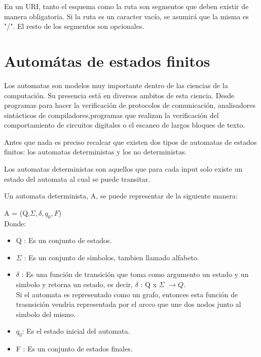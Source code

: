 \documentclass{article}
\begin{document}
En un URI, tanto el esquema como la ruta son segmentos que deben existir de manera obligatoria. Si la ruta es un caracter vac\'io, se asumir\'a que la misma es "/". El resto de los segmentos son opcionales.\\

\section{Autom\'atas de estados finitos}

Los automatas son modelos muy importante dentro de las ciencias de la computaci\'on. Su presencia est\'a  en diversos ambitos de esta ciencia. Desde programas para hacer la verificaci\'on de protocolos de comunicaci\'on, analisadores sint\'acticos de compiladores,programas que realizan la verificaci\'on del comportamiento de circuitos digitales o el escaneo de largos bloques de texto.

Antes que nada es preciso recalcar que existen dos tipos de automatas de estados finitos: los automatas deterministas y los no deterministas.

Los automatas deterministas son aquellos que para cada input solo existe un estado del automata al cual se puede transitar.

Un automata determinista, A, se puede representar de la siguiente manera:

A = (Q,$\Sigma,\delta,q_{0},F$)\\

Donde:

\begin{itemize}

\item Q : Es un conjunto de estados.\\
\item $\Sigma$ : Es un conjunto de simbolos, tambien llamado alfabeto.\\

\item $\delta$ : Es una funci\'on de transici\'on que toma como argumento un estado y un simbolo y retorna un estado, es decir, $\delta$ : Q x $\Sigma$ $\rightarrow Q.$\\
Si el automata es representado como un grafo, entonces esta funci\'on de trasnsici\'on vendria representada por el arcco que une dos nodos junto al simbolo del mismo.

\item $q_{0}$: Es el estado inicial del automata.\\

\item F : Es un conjunto de estados finales.\\

\end{itemize}
\end{document}
